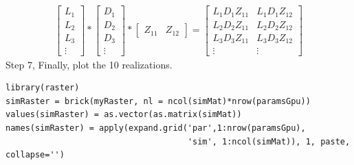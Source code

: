 \documentclass[article,nojss]{jss}\usepackage[]{graphicx}\usepackage[]{color}
\makeatletter
\newenvironment{kframe}{%
 \def\at@end@of@kframe{}%
 \ifinner\ifhmode%
  \def\at@end@of@kframe{\end{minipage}}%
  \begin{minipage}{\columnwidth}%
 \fi\fi%
 \def\FrameCommand##1{\hskip\@totalleftmargin \hskip-\fboxsep
 \colorbox{shadecolor}{##1}\hskip-\fboxsep
     \hskip-\linewidth \hskip-\@totalleftmargin \hskip\columnwidth}%
 \MakeFramed {\advance\hsize-\width
   \@totalleftmargin\z@ \linewidth\hsize
   \@setminipage}}%
 {\par\unskip\endMakeFramed%
 \at@end@of@kframe}
\newenvironment{knitrout}{}{} %
\makeatother
\begin{document}
\begin{gather}
 \begin{bmatrix}  L_{1} \\ L_{2} \\L_{3} \\ \vdots
 \end{bmatrix} 
 *
  \begin{bmatrix}
   D_{1} \\ D_{2} \\D_{3} \\ \vdots
   \end{bmatrix} 
   *
   \begin{bmatrix}
   Z_{11} & Z_{12}
   \end{bmatrix}
  =
 \begin{bmatrix}
   L_1D_1Z_{11} & L_1D_1Z_{12} \\
   L_2D_2Z_{11} & L_2D_2Z_{12} \\
   L_3D_3Z_{11} & L_3D_3Z_{12} \\
   \vdots  &   \vdots
  \end{bmatrix}
\end{gather}
Step 7, Finally, plot the 10 realizations.
\begin{knitrout}
\color{fgcolor}\begin{kframe}
\begin{verbatim}
library(raster)
simRaster = brick(myRaster, nl = ncol(simMat)*nrow(paramsGpu))
values(simRaster) = as.vector(as.matrix(simMat))
names(simRaster) = apply(expand.grid('par',1:nrow(paramsGpu), 
                                     'sim', 1:ncol(simMat)), 1, paste, collapse='')
\end{verbatim}
\end{kframe}
\end{knitrout}
\end{document}
